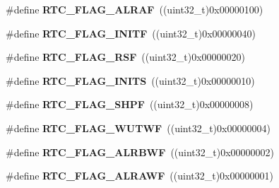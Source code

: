 \begin{DoxyCompactItemize}
\item 
\hypertarget{group___r_t_c___flags___definitions_gaf9e1a4b5eedd674d7b35ae334877ba12}{}\#define {\bfseries R\+T\+C\+\_\+\+F\+L\+A\+G\+\_\+\+A\+L\+R\+A\+F}~((uint32\+\_\+t)0x00000100)\label{group___r_t_c___flags___definitions_gaf9e1a4b5eedd674d7b35ae334877ba12}

\item 
\hypertarget{group___r_t_c___flags___definitions_ga8d973d7f6b07e80743e05d6822ff2147}{}\#define {\bfseries R\+T\+C\+\_\+\+F\+L\+A\+G\+\_\+\+I\+N\+I\+T\+F}~((uint32\+\_\+t)0x00000040)\label{group___r_t_c___flags___definitions_ga8d973d7f6b07e80743e05d6822ff2147}

\item 
\hypertarget{group___r_t_c___flags___definitions_ga78c4245996bef8d5f39226b6e37ed9c0}{}\#define {\bfseries R\+T\+C\+\_\+\+F\+L\+A\+G\+\_\+\+R\+S\+F}~((uint32\+\_\+t)0x00000020)\label{group___r_t_c___flags___definitions_ga78c4245996bef8d5f39226b6e37ed9c0}

\item 
\hypertarget{group___r_t_c___flags___definitions_gae6a2d26d4b10670f6506b14971f52fd2}{}\#define {\bfseries R\+T\+C\+\_\+\+F\+L\+A\+G\+\_\+\+I\+N\+I\+T\+S}~((uint32\+\_\+t)0x00000010)\label{group___r_t_c___flags___definitions_gae6a2d26d4b10670f6506b14971f52fd2}

\item 
\hypertarget{group___r_t_c___flags___definitions_ga8fd11878d6285ab5d35966d598d5e6f9}{}\#define {\bfseries R\+T\+C\+\_\+\+F\+L\+A\+G\+\_\+\+S\+H\+P\+F}~((uint32\+\_\+t)0x00000008)\label{group___r_t_c___flags___definitions_ga8fd11878d6285ab5d35966d598d5e6f9}

\item 
\hypertarget{group___r_t_c___flags___definitions_ga24648116b32442d30da74c497e2e88ae}{}\#define {\bfseries R\+T\+C\+\_\+\+F\+L\+A\+G\+\_\+\+W\+U\+T\+W\+F}~((uint32\+\_\+t)0x00000004)\label{group___r_t_c___flags___definitions_ga24648116b32442d30da74c497e2e88ae}

\item 
\hypertarget{group___r_t_c___flags___definitions_gae9dd4b5b8059937c3422bc1e3eae3ced}{}\#define {\bfseries R\+T\+C\+\_\+\+F\+L\+A\+G\+\_\+\+A\+L\+R\+B\+W\+F}~((uint32\+\_\+t)0x00000002)\label{group___r_t_c___flags___definitions_gae9dd4b5b8059937c3422bc1e3eae3ced}

\item 
\hypertarget{group___r_t_c___flags___definitions_gaf4913efa96d03ded991b1cdddd6b7823}{}\#define {\bfseries R\+T\+C\+\_\+\+F\+L\+A\+G\+\_\+\+A\+L\+R\+A\+W\+F}~((uint32\+\_\+t)0x00000001)\label{group___r_t_c___flags___definitions_gaf4913efa96d03ded991b1cdddd6b7823}


\end{DoxyCompactItemize}
